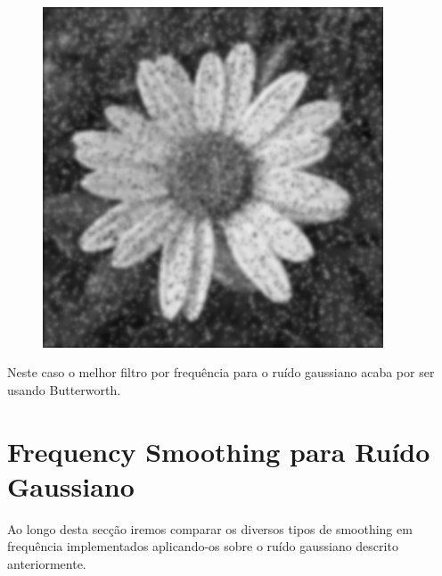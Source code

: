 \documentclass[a4paper]{report}
\begin{document}
\begin{figure}[H]
\begin{minipage}{.3\textwidth}
\end{minipage}%
\begin{minipage}{.3\textwidth}
  \centering
  \includegraphics[width=0.9\textwidth]{images/Smooth/frequency-salt-n-pepper/flower_smooth_frequency_Butterworth_2_80.png}
\end{minipage}
\end{figure}

Neste caso o melhor filtro por frequência  para o ruído gaussiano acaba por ser usando Butterworth.

\section{Frequency Smoothing para Ruído Gaussiano}
Ao longo desta secção iremos comparar os diversos tipos de smoothing em frequência implementados aplicando-os sobre o ruído
gaussiano descrito anteriormente.
\end{document}
